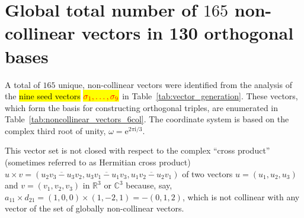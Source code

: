 \documentclass[%
  reprint,
  superscriptaddress,
  showpacs,
  showkeys,
  amsmath,amssymb,
  pra,
  longbibliography,
  floatfix,
  x11names
]{revtex4-2}
\newcommand{\ii}{\mathrm{i}}
\newcommand{\corr}[1]{{\color{red}\hl{#1}}}
\newcommand{\corrmath}[1]{\begingroup\setlength{\fboxsep}{1pt}\colorbox{yellow}{\ensuremath{\color{red}#1}}\endgroup}
\begin{document}
\section{Global total number of $165$ non-collinear vectors in 130 orthogonal bases}

A total of $165$ unique, non-collinear vectors were identified from the analysis of the
\corr{nine seed vectors} \corrmath{\sigma_1,\ldots,\sigma_9}
in Table~\ref{tab:vector_generation}.
These vectors, which form the basis for constructing orthogonal triples, are enumerated in Table~\ref{tab:noncollinear_vectors_6col}.
The coordinate system is based on the complex third root of unity, $\omega = \mathrm{e}^{2\pi \ii{}/3}$.

This vector set is not closed with respect to the complex ``cross product''~\cite{harding2025remarksIJTP} (sometimes referred to as Hermitian cross product)
\(
u\times v =  (\overline{u_2v_3-u_3v_2},\overline{u_3v_1-u_1v_3},\overline{u_1v_2-u_2v_1})
\)
of two vectors $u=(u_1,u_2,u_3)$ and $v=(v_1,v_2,v_3)$ in $\mathbb{R}^3$ or $\mathbb{C}^3$ because, say,
$a_{11} \times d_{21} = (1,0,0) \times (1,-2,1) = -(0,1,2)$, which is not collinear with any vector of the set of globally non-collinear vectors.
\end{document}
